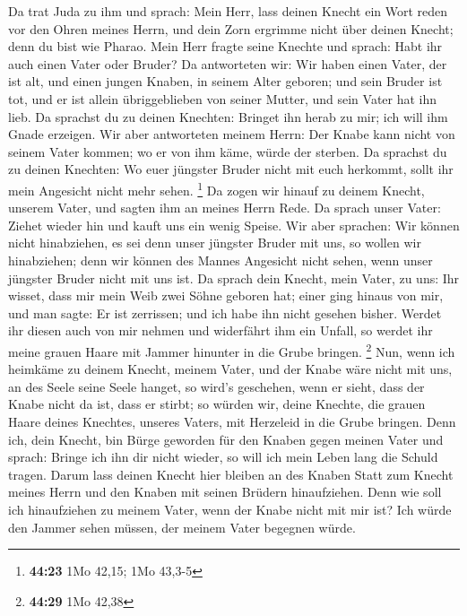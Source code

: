  Da trat Juda zu ihm und sprach: Mein Herr, lass deinen
Knecht ein Wort reden vor den Ohren meines Herrn, und dein Zorn ergrimme
nicht über deinen Knecht; denn du bist wie Pharao.  Mein
Herr fragte seine Knechte und sprach: Habt ihr auch einen Vater oder
Bruder?  Da antworteten wir: Wir haben einen Vater, der
ist alt, und einen jungen Knaben, in seinem Alter geboren; und sein
Bruder ist tot, und er ist allein übriggeblieben von seiner Mutter, und
sein Vater hat ihn lieb.  Da sprachst du zu deinen
Knechten: Bringet ihn herab zu mir; ich will ihm Gnade erzeigen.
 Wir aber antworteten meinem Herrn: Der Knabe kann nicht
von seinem Vater kommen; wo er von ihm käme, würde der sterben.
 Da sprachst du zu deinen Knechten: Wo euer jüngster
Bruder nicht mit euch herkommt, sollt ihr mein Angesicht nicht mehr
sehen. \footnote{\textbf{44:23} 1Mo 42,15; 1Mo 43,3-5} 
Da zogen wir hinauf zu deinem Knecht, unserem Vater, und sagten ihm an
meines Herrn Rede.  Da sprach unser Vater: Ziehet wieder
hin und kauft uns ein wenig Speise.  Wir aber sprachen:
Wir können nicht hinabziehen, es sei denn unser jüngster Bruder mit uns,
so wollen wir hinabziehen; denn wir können des Mannes Angesicht nicht
sehen, wenn unser jüngster Bruder nicht mit uns ist.  Da
sprach dein Knecht, mein Vater, zu uns: Ihr wisset, dass mir mein Weib
zwei Söhne geboren hat;  einer ging hinaus von mir, und
man sagte: Er ist zerrissen; und ich habe ihn nicht gesehen bisher.
 Werdet ihr diesen auch von mir nehmen und widerfährt ihm
ein Unfall, so werdet ihr meine grauen Haare mit Jammer hinunter in die
Grube bringen. \footnote{\textbf{44:29} 1Mo 42,38}  Nun,
wenn ich heimkäme zu deinem Knecht, meinem Vater, und der Knabe wäre
nicht mit uns, an des Seele seine Seele hanget,  so
wird's geschehen, wenn er sieht, dass der Knabe nicht da ist, dass er
stirbt; so würden wir, deine Knechte, die grauen Haare deines Knechtes,
unseres Vaters, mit Herzeleid in die Grube bringen.  Denn
ich, dein Knecht, bin Bürge geworden für den Knaben gegen meinen Vater
und sprach: Bringe ich ihn dir nicht wieder, so will ich mein Leben lang
die Schuld tragen.  Darum lass deinen Knecht hier bleiben
an des Knaben Statt zum Knecht meines Herrn und den Knaben mit seinen
Brüdern hinaufziehen.  Denn wie soll ich hinaufziehen zu
meinem Vater, wenn der Knabe nicht mit mir ist? Ich würde den Jammer
sehen müssen, der meinem Vater begegnen würde.

